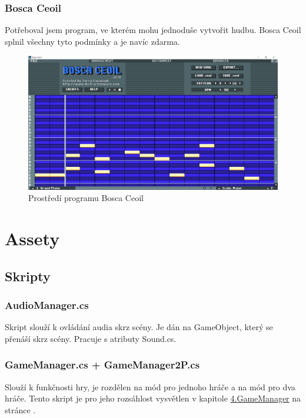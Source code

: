 \documentclass[12pt,a4paper]{report}
\begin{document}
\subsection{Bosca Ceoil}
Potřeboval jsem program, ve kterém mohu jednoduše vytvořit hudbu. Bosca Ceoil splnil všechny tyto podmínky a je navíc zdarma.
\newline
\begin{figure}[H]\centering
    \includegraphics[width=\textwidth]{images/bosca_ceoil.png}
    \caption{Prostředí programu Bosca Ceoil}
\end{figure}
\chapter{Assety}
\section{Skripty}
\subsection{AudioManager.cs}
Skript slouží k ovládání audia skrz scény. Je dán na GameObject, který se přenáší skrz scény.
Pracuje s atributy Sound.cs.
\subsection{GameManager.cs + GameManager2P.cs}
Slouží k funkčnosti hry, je rozdělen na mód pro jednoho hráče a na mód pro dva hráče.
Tento skript je pro jeho rozsáhlost vysvětlen v kapitole
\hyperref[sec:gamemanager]{4.GameManager} na stránce \pageref*{sec:gamemanager}.
\end{document}
